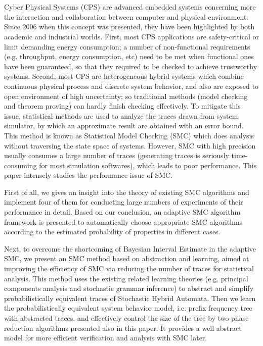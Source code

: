 \newpage
\vspace{-1cm}
\chapter*{}

Cyber Physical Systems (CPS) are advanced embedded systems concerning more the interaction and collaboration between computer and physical environment. Since 2006 when this concept was presented, they have been highlighted by both academic and industrial worlds. First, most CPS applications are safety-critical or limit demanding energy consumption; a number of non-functional requirements (e.g. throughput, energy consumption, etc) need to be met when functional ones have been guaranteed, so that they required to be checked to achieve trustworthy systems. Second, most CPS are heterogeneous hybrid systems which combine continuous physical process and discrete system behavior, and also are exposed to open environment of high uncertainty; so traditional methods (model checking and theorem proving) can hardly finish checking effectively. To mitigate this issue, statistical methods are used to analyze the traces drawn from system simulator, by which an approximate result are obtained with an error bound. This method is known as Statistical Model Checking (SMC) which does analysis without traversing the state space of systems. However, SMC with high precision usually consumes a large number of traces (generating traces is seriously time-consuming for most simulation softwares), which leads to poor performance. This paper intensely studies the performance issue of SMC.

First of all, we gives an insight into the theory of existing SMC algorithms and implement four of them for conducting large numbers of experiments of their performance in detail. Based on our conclusion, an adaptive SMC algorithm framework is presented to automatically choose appropriate SMC algorithms according to the estimated probability of properties in different cases.

Next, to overcome the shortcoming of Bayesian Interval Estimate in the adaptive SMC, we present an SMC method based on abstraction and learning, aimed at improving the efficiency of SMC via reducing the number of traces for statistical analysis. This method uses the existing related learning theories (e.g. principal components analysis and stochastic grammar inference) to abstract and simplify probabilistically equivalent traces of Stochastic Hybrid Automata. Then we learn the probabilistically equivalent system behavior model, i.e. prefix frequency tree with abstracted traces, and effectively control the size of the tree by two-phase reduction algorithms presented also in this paper. It provides a well abstract model for more efficient verification and analysis with SMC later.

